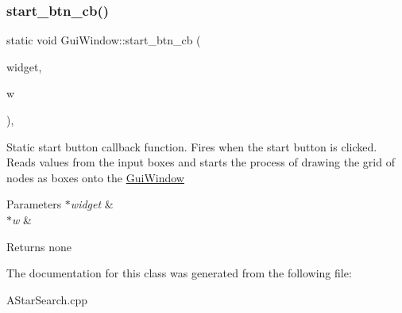\subsubsection{\texorpdfstring{start\+\_\+btn\+\_\+cb()}{start\_btn\_cb()}}
{\footnotesize\ttfamily static void Gui\+Window\+::start\+\_\+btn\+\_\+cb (\begin{DoxyParamCaption}\item[{Fl\+\_\+\+Widget $\ast$}]{widget,  }\item[{void $\ast$}]{w }\end{DoxyParamCaption})\hspace{0.3cm}{\ttfamily [inline]}, {\ttfamily [static]}}

Static start button callback function. Fires when the start button is clicked. Reads values from the input boxes and starts the process of drawing the grid of nodes as boxes onto the \hyperlink{classGuiWindow}{Gui\+Window}


\begin{DoxyParams}{Parameters}
{\em $\ast$widget} & \\
\hline
{\em $\ast$w} & \\
\hline
\end{DoxyParams}
\begin{DoxyReturn}{Returns}
none 
\end{DoxyReturn}


The documentation for this class was generated from the following file\+:\begin{DoxyCompactItemize}
\item 
A\+Star\+Search.\+cpp\end{DoxyCompactItemize}
